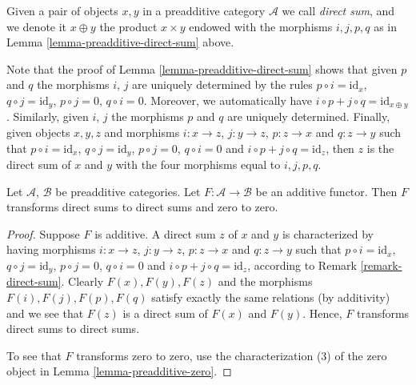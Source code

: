 \begin{definition}
\label{definition-direct-sum}
Given a pair of objects $x, y$
in a preadditive category $\mathcal{A}$ we call
{\it direct sum}, and we denote it $x \oplus y$ the
product $x \times y$ endowed with the morphisms
$i, j, p, q$ as in Lemma \ref{lemma-preadditive-direct-sum} above.
\end{definition}

\begin{remark}
\label{remark-direct-sum}
Note that the proof of Lemma \ref{lemma-preadditive-direct-sum}
shows that given $p$ and $q$ the morphisms $i$, $j$ are uniquely
determined by the rules $p \circ i = \text{id}_x$,
$q \circ j = \text{id}_y$, $p \circ j = 0$, $q \circ i = 0$.
Moreover, we automatically have
$i \circ p + j \circ q = \text{id}_{x \oplus y}$.
Similarly, given $i$, $j$ the morphisms $p$ and $q$ are uniquely determined.
Finally, given objects $x, y, z$ and morphisms
$i : x \to z$, $j : y \to z$, $p : z \to x$ and
$q : z \to y$ such that $p \circ i = \text{id}_x$,
$q \circ j = \text{id}_y$, $p \circ j = 0$, $q \circ i = 0$
and $i \circ p + j \circ q = \text{id}_z$, then $z$
is the direct sum of $x$ and $y$ with the four morphisms
equal to $i, j, p, q$.
\end{remark}

\begin{lemma}
\label{lemma-additive-additive}
Let $\mathcal{A}$, $\mathcal{B}$ be preadditive categories.
Let $F : \mathcal{A} \to \mathcal{B}$ be an additive functor.
Then $F$ transforms direct sums to direct sums and zero to zero.
\end{lemma}

\begin{proof}
Suppose $F$ is additive. A direct sum $z$
of $x$ and $y$ is characterized by having morphisms
$i : x \to z$, $j : y \to z$, $p : z \to x$ and
$q : z \to y$ such that $p \circ i = \text{id}_x$,
$q \circ j = \text{id}_y$, $p \circ j = 0$, $q \circ i = 0$
and $i \circ p + j \circ q = \text{id}_z$, according
to Remark \ref{remark-direct-sum}. Clearly $F(x), F(y), F(z)$
and the morphisms $F(i), F(j), F(p), F(q)$ satisfy exactly the
same relations (by additivity) and we see that $F(z)$ is
a direct sum of $F(x)$ and $F(y)$.
Hence, $F$ transforms direct sums to direct sums.

To see that $F$ transforms zero to zero, use the
characterization (3) of the zero object in
Lemma \ref{lemma-preadditive-zero}.
\end{proof}

